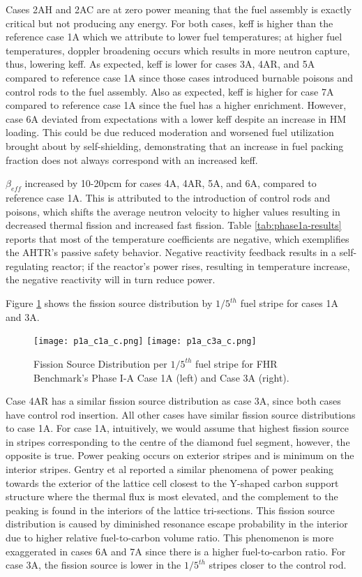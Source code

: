 Cases 2AH and 2AC are at zero power meaning that the fuel assembly is exactly 
critical but not producing any energy. 
For both cases, keff is higher than the reference case 1A which we attribute to 
lower fuel temperatures; at higher fuel temperatures, doppler broadening occurs 
which results in more neutron capture, thus, lowering keff. 
As expected, keff is lower for cases 3A, 4AR, and 5A compared to reference case 
1A since those cases introduced burnable poisons and control rods to the fuel 
assembly. 
Also as expected, keff is higher for case 7A compared to reference case 1A since 
the fuel has a higher enrichment. 
However, case 6A deviated from expectations with a lower keff despite an increase 
in \gls{HM} loading. 
This could be due reduced moderation and worsened fuel utilization brought 
about by self-shielding, demonstrating that an increase in fuel packing 
fraction does not always correspond with an increased keff. 

$\beta_{eff}$ increased by 10-20pcm for cases 4A, 4AR, 5A, and 6A, compared to
reference case 1A.
This is attributed to the introduction of control rods and poisons, which 
shifts the average neutron velocity to higher values resulting in decreased
thermal fission and increased fast fission\cite{torabi_neutronic_2018}.
Table \ref{tab:phase1a-results} reports that most of the temperature coefficients 
are negative, which exemplifies the \gls{AHTR}'s passive safety behavior. 
Negative reactivity feedback results in a self-regulating reactor; if the reactor's 
power rises, resulting in temperature increase, the negative reactivity will in turn 
reduce power. 

Figure \ref{fig:phase1a-c} shows the fission source distribution by 
$1/5^{th}$ fuel stripe for cases 1A and 3A. 
\begin{figure}[]
    \centering
    \texttt{[image: p1a\_c1a\_c.png]} 
    \texttt{[image: p1a\_c3a\_c.png]} 
    \caption{Fission Source Distribution per $1/5^{th}$ fuel stripe for \gls{FHR} 
    Benchmark's Phase I-A Case 1A (left) and Case 3A (right).}
    \label{fig:phase1a-c}
\end{figure}
Case 4AR has a similar fission source distribution as case 3A, since both 
cases have control rod insertion. 
All other cases have similar fission source distributions to case 1A. 
For case 1A, intuitively, we would assume that highest fission source in stripes 
corresponding to the centre of the diamond fuel segment, however, the opposite is 
true. 
Power peaking occurs on exterior stripes and is minimum on the interior stripes.  
Gentry et al \cite{gentry_development_2016} reported a similar phenomena of 
power peaking towards the exterior of the lattice cell closest to the Y-shaped 
carbon support structure where the thermal flux is most elevated, and the 
complement to the peaking is found in the interiors of the lattice tri-sections. 
This fission source distribution is caused by  diminished resonance escape 
probability in the interior due to higher relative fuel-to-carbon volume ratio. 
This phenomenon is more exaggerated in cases 6A and 7A since there is a higher 
fuel-to-carbon ratio. 
For case 3A, the fission source is lower in the $1/5^{th}$ stripes closer to 
the control rod.  

